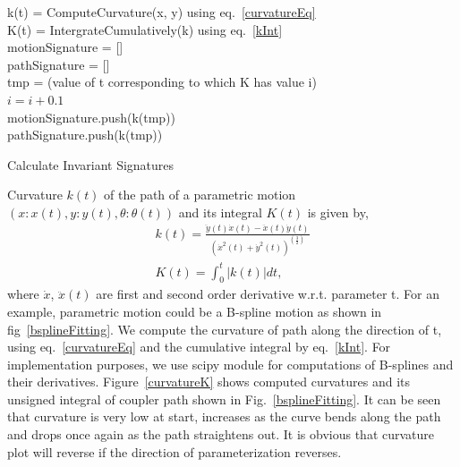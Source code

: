 \documentclass[twocolumn,10pt]{asme2e}
\begin{document}
\begin{algorithm}
    k(t) = ComputeCurvature(x, y) using eq.~\ref{curvatureEq} \\
    K(t) = IntergrateCumulatively(k) using eq.~\ref{kInt} \\
    motionSignature = [] \\
    pathSignature = [] \\
    {
      tmp = (value of t corresponding to which K has value i) \\
      $i = i + 0.1$ \\
      motionSignature.push(k(tmp)) \\
      pathSignature.push(k(tmp))
    }
    \caption{Calculate Invariant Signatures}
    \label{alg_signature}
\end{algorithm}

Curvature $k(t)$ of the path of a parametric motion $(x:x(t), y:y(t), \theta:\theta(t))$ and its integral $K(t)$ is given by,
\begin{eqnarray}
  k(t) = \frac{\ddot{y}(t)\dot{x}(t) - \ddot{x}(t)\dot{y}(t)}{{(\dot{x}^2(t) + \dot{y}^2(t))}^{(\frac 32)}} \label{curvatureEq}\\
  K(t) = \int^{t}_0 |k(t)|dt \label{kInt},
\end{eqnarray}
where $\dot{x}$, $\ddot{x}(t)$ are first and second order derivative w.r.t. parameter t.
For an example, parametric motion could be a B-spline motion as shown in fig~\ref{bsplineFitting}.
We compute the curvature of path along the direction of t, using eq.~\ref{curvatureEq} and the cumulative integral by eq.~\ref{kInt}.
For implementation purposes, we use scipy\cite{scipy} module for computations of B-splines and their derivatives.
Figure~\ref{curvatureK} shows computed curvatures and its unsigned integral of coupler path shown in Fig.~\ref{bsplineFitting}.
It can be seen that curvature is very low at start, increases as the curve bends along the path and drops once again as the path straightens out.
It is obvious that curvature plot will reverse if the direction of parameterization reverses.
\end{document}
